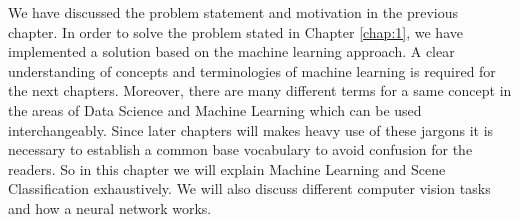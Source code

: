 We have discussed the problem statement and motivation in the previous chapter. In order to solve the problem stated in Chapter \ref{chap:1}, we have implemented a solution based on the machine learning approach. A clear understanding of concepts and terminologies of machine learning is required for the next chapters. Moreover, there are many different terms for a same concept in the areas of Data Science and Machine Learning which can be used interchangeably. Since later chapters will makes heavy use of these jargons it is necessary to establish a common base vocabulary to avoid confusion for the readers. So in this chapter we will explain Machine Learning and Scene Classification exhaustively. We will also discuss different computer vision tasks and how a neural network works.





